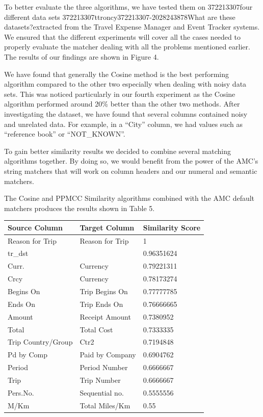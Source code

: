 \documentclass{sig-alternate}
\begin{document}
To better evaluate the three algorithms, we have tested them on 372213307four different data sets 372213307ttroncy372213307-2028243878What are these datasets?extracted from the Travel Expense Manager and Event Tracker systems. We ensured that the different experiments will cover all the cases needed to properly evaluate the matcher dealing with all the problems mentioned earlier. The results of our findings are shown in Figure 4. 




We have found that generally the Cosine method is the best performing algorithm compared to the other two especially when dealing with noisy data sets. This was noticed particularly in our fourth experiment as the Cosine algorithm performed around 20\% better than the other two methods. After investigating the dataset, we have found that several columns contained noisy and unrelated data. For example, in a ``City'' column, we had values such as ``reference book'' or ``NOT\_KNOWN''. 

To gain better similarity results we decided to combine several matching algorithms together. By doing so, we would benefit from the power of the AMC's string matchers that will work on column headers and our numeral and semantic matchers. 

The Cosine and PPMCC Similarity algorithms combined with the AMC default matchers produces the results shown in Table 5.



\begin{tabular}{|p{0.7in}|p{0.8in}|p{0.8in}|} \hline 
\textbf{Source Column} & \textbf{Target Column} & \textbf{Similarity Score} \\ \hline 
Reason for Trip & Reason for Trip & 1 \\ \hline 
tr\_dst &  & 0.96351624 \\ \hline 
Curr. & Currency & 0.79221311 \\ \hline 
Crcy & Currency & 0.78173274 \\ \hline 
Begins On & Trip Begins On & 0.77777785 \\ \hline 
Ends On & Trip Ends On & 0.76666665 \\ \hline 
Amount & Receipt Amount & 0.7380952 \\ \hline 
Total & Total Cost & 0.7333335 \\ \hline 
Trip Country/Group & Ctr2 & 0.7194848 \\ \hline 
Pd by Comp & Paid by Company & 0.6904762 \\ \hline 
Period & Period Number & 0.6666667 \\ \hline 
Trip & Trip Number & 0.6666667 \\ \hline 
Pers.No. & Sequential no. & 0.5555556 \\ \hline 
M/Km & Total Miles/Km & 0.55 \\ \hline 
\end{tabular}
\end{document}
